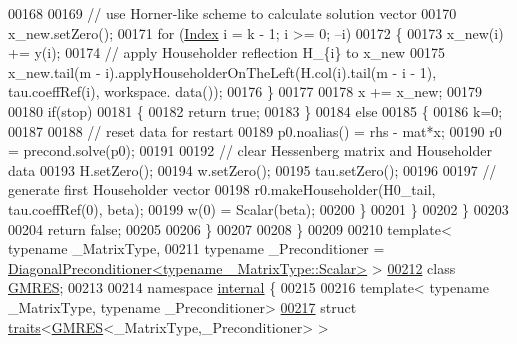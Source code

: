 \begin{DoxyCode}
00168 
00169       \textcolor{comment}{// use Horner-like scheme to calculate solution vector}
00170       x\_new.setZero();
00171       \textcolor{keywordflow}{for} (\hyperlink{namespace_eigen_a62e77e0933482dafde8fe197d9a2cfde}{Index} i = k - 1; i >= 0; --i)
00172       \{
00173         x\_new(i) += y(i);
00174         \textcolor{comment}{// apply Householder reflection H\_\{i\} to x\_new}
00175         x\_new.tail(m - i).applyHouseholderOnTheLeft(H.col(i).tail(m - i - 1), tau.coeffRef(i), workspace.
      data());
00176       \}
00177 
00178       x += x\_new;
00179 
00180       \textcolor{keywordflow}{if}(stop)
00181       \{
00182         \textcolor{keywordflow}{return} \textcolor{keyword}{true};
00183       \}
00184       \textcolor{keywordflow}{else}
00185       \{
00186         k=0;
00187 
00188         \textcolor{comment}{// reset data for restart}
00189         p0.noalias() = rhs - mat*x;
00190         r0 = precond.solve(p0);
00191 
00192         \textcolor{comment}{// clear Hessenberg matrix and Householder data}
00193         H.setZero();
00194         w.setZero();
00195         tau.setZero();
00196 
00197         \textcolor{comment}{// generate first Householder vector}
00198         r0.makeHouseholder(H0\_tail, tau.coeffRef(0), beta);
00199         w(0) = Scalar(beta);
00200       \}
00201     \}
00202   \}
00203 
00204   \textcolor{keywordflow}{return} \textcolor{keyword}{false};
00205 
00206 \}
00207 
00208 \}
00209 
00210 \textcolor{keyword}{template}< \textcolor{keyword}{typename} \_MatrixType,
00211           \textcolor{keyword}{typename} \_Preconditioner = 
      \hyperlink{group___iterative_linear_solvers___module_class_eigen_1_1_diagonal_preconditioner}{DiagonalPreconditioner<typename \_MatrixType::Scalar>} >
\hyperlink{group___iterative_linear_solvers___module}{00212} \textcolor{keyword}{class }\hyperlink{group___iterative_linear_solvers___module_class_eigen_1_1_g_m_r_e_s}{GMRES};
00213 
00214 \textcolor{keyword}{namespace }\hyperlink{namespaceinternal}{internal} \{
00215 
00216 \textcolor{keyword}{template}< \textcolor{keyword}{typename} \_MatrixType, \textcolor{keyword}{typename} \_Preconditioner>
\hyperlink{struct_eigen_1_1internal_1_1traits_3_01_g_m_r_e_s_3_01___matrix_type_00_01___preconditioner_01_4_01_4}{00217} \textcolor{keyword}{struct }\hyperlink{struct_eigen_1_1internal_1_1traits}{traits}<\hyperlink{group___iterative_linear_solvers___module_class_eigen_1_1_g_m_r_e_s}{GMRES}<\_MatrixType,\_Preconditioner> >

\end{DoxyCode}
